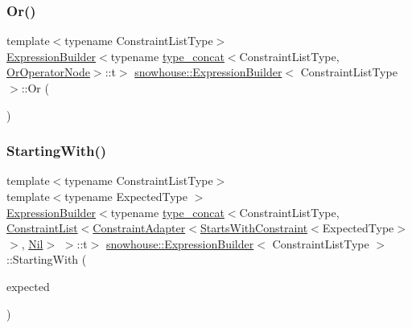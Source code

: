\mbox{\label{structsnowhouse_1_1ExpressionBuilder_aac1267b9a7d94e22e69d98135edc6896}} 
\subsubsection{\texorpdfstring{Or()}{Or()}}
{\footnotesize\ttfamily template$<$typename Constraint\+List\+Type$>$ \\
\mbox{\hyperlink{structsnowhouse_1_1ExpressionBuilder}{Expression\+Builder}}$<$typename \mbox{\hyperlink{structsnowhouse_1_1type__concat}{type\+\_\+concat}}$<$Constraint\+List\+Type, \mbox{\hyperlink{structsnowhouse_1_1ExpressionBuilder_a57a8b9f5c8cdc9cc9b8ae5165a515e61}{Or\+Operator\+Node}}$>$\+::t$>$ \mbox{\hyperlink{structsnowhouse_1_1ExpressionBuilder}{snowhouse\+::\+Expression\+Builder}}$<$ Constraint\+List\+Type $>$\+::Or (\begin{DoxyParamCaption}{ }\end{DoxyParamCaption})\hspace{0.3cm}{\ttfamily [inline]}}

\mbox{\label{structsnowhouse_1_1ExpressionBuilder_a0482afe40b668c1a2eabe00426ada398}} 
\subsubsection{\texorpdfstring{StartingWith()}{StartingWith()}\hspace{0.1cm}{\footnotesize\ttfamily [1/2]}}
{\footnotesize\ttfamily template$<$typename Constraint\+List\+Type$>$ \\
template$<$typename Expected\+Type $>$ \\
\mbox{\hyperlink{structsnowhouse_1_1ExpressionBuilder}{Expression\+Builder}}$<$typename \mbox{\hyperlink{structsnowhouse_1_1type__concat}{type\+\_\+concat}}$<$Constraint\+List\+Type, \mbox{\hyperlink{structsnowhouse_1_1ConstraintList}{Constraint\+List}}$<$\mbox{\hyperlink{structsnowhouse_1_1ConstraintAdapter}{Constraint\+Adapter}}$<$\mbox{\hyperlink{structsnowhouse_1_1StartsWithConstraint}{Starts\+With\+Constraint}}$<$Expected\+Type$>$ $>$, \mbox{\hyperlink{structsnowhouse_1_1Nil}{Nil}}$>$ $>$\+::t$>$ \mbox{\hyperlink{structsnowhouse_1_1ExpressionBuilder}{snowhouse\+::\+Expression\+Builder}}$<$ Constraint\+List\+Type $>$\+::Starting\+With (\begin{DoxyParamCaption}\item[{const Expected\+Type \&}]{expected }\end{DoxyParamCaption})\hspace{0.3cm}{\ttfamily [inline]}}

